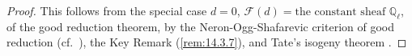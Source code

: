 \begin{proof}
This follows from the special case $d = 0$, $\mathcal{F}(d) = \text{the constant sheaf } \mathbb{Q}_\ell$, of the good reduction theorem, by the Neron-Ogg-Shafarevic criterion of good reduction (cf.~\cite{SeTa2}), the Key Remark (\ref{rem:14.3.7}), and Tate's isogeny theorem \cite{Ta1}.
\end{proof}
